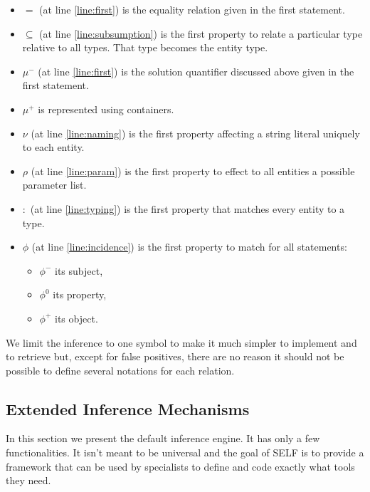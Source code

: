 \documentclass[11pt,a4paper,twoside,openright,titlepage,numbers=noenddot,headinclude,cleardoublepage=empty,openany]{scrreprt}
\theoremstyle{plain}
\theoremstyle{definition}
\theoremstyle{remark}
\providecommand{\tightlist}{%
  \setlength{\itemsep}{0pt}\setlength{\parskip}{0pt}}
\begin{document}
\begin{itemize}
\tightlist
\item
  \(=\) (at line \ref{line:first}) is the equality relation given in the
  first statement.
\item
  \(\subseteq\) (at line \ref{line:subsumption}) is the first property
  to relate a particular type relative to all types. That type becomes
  the entity type.
\item
  \(\mu^-\) (at line \ref{line:first}) is the solution quantifier
  discussed above given in the first statement.
\item
  \(\mu^+\) is represented using containers.
\item
  \(\nu\) (at line \ref{line:naming}) is the first property affecting a
  string literal uniquely to each entity.
\item
  \(\rho\) (at line \ref{line:param}) is the first property to effect to
  all entities a possible parameter list.
\item
  \(:\) (at line \ref{line:typing}) is the first property that matches
  every entity to a type.
\item
  \(\phi\) (at line \ref{line:incidence}) is the first property to match
  for all statements:

  \begin{itemize}
  \tightlist
  \item
    \(\phi^-\) its subject,
  \item
    \(\phi^0\) its property,
  \item
    \(\phi^+\) its object.
  \end{itemize}
\end{itemize}

We limit the inference to one symbol to make it much simpler to
implement and to retrieve but, except for false positives, there are no
reason it should not be possible to define several notations for each
relation.

\hypertarget{extended-inference-mechanisms}{%
\subsection{Extended Inference
Mechanisms}\label{extended-inference-mechanisms}}

In this section we present the default inference engine. It has only a
few functionalities. It isn't meant to be universal and the goal of SELF
is to provide a framework that can be used by specialists to define and
code exactly what tools they need.
\end{document}

